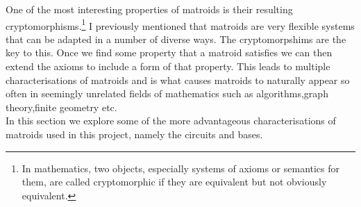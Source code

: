 \documentclass[../main.tex]{subfiles}
\begin{document}
One of the most interesting properties of matroids is their resulting cryptomorphisms.\footnote{In mathematics, two objects, especially systems of axioms or semantics for them, are called cryptomorphic if they are equivalent but not obviously equivalent.\cite{wiki}}
I previously mentioned that matroids are very flexible systems that can be adapted in a number of diverse ways. The cryptomorpshims are the key to this. Once we find some property that a matroid satisfies we can then extend the axioms to include a form of that property. This leads to multiple characterisations of matroids and is what causes matroids to naturally appear so often in seemingly unrelated fields of mathematics such as algorithms,graph theory,finite geometry etc.\\
In this section we explore some of the more advantageous characterisations of matroids used in this project, namely the circuits and bases.
\end{document}
